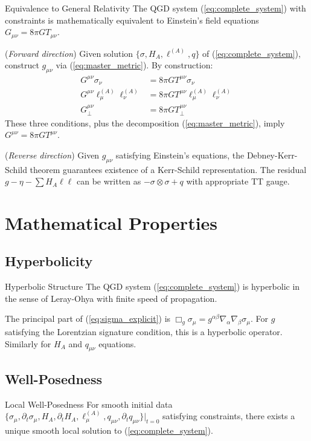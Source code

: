 \documentclass[11pt,a4paper]{article}
\theoremstyle{definition}
\theoremstyle{remark}
\begin{document}
			Equivalence to General Relativity
			The QGD system (\ref{eq:complete_system}) with constraints is mathematically equivalent to Einstein's field equations $G_{\mu\nu} = 8\pi G T_{\mu\nu}$.
		
			(\textit{Forward direction}) Given solution $\{\sigma, H_A, \ell^{(A)}, q\}$ of (\ref{eq:complete_system}), construct $g_{\mu\nu}$ via (\ref{eq:master_metric}). By construction:
			\begin{align}
				G^{\mu\nu}\sigma_\nu &= 8\pi G T^{\mu\nu}\sigma_\nu\\
				G^{\mu\nu}\ell_\mu^{(A)}\ell_\nu^{(A)} &= 8\pi G T^{\mu\nu}\ell_\mu^{(A)}\ell_\nu^{(A)}\\
				G_{\perp}^{\mu\nu} &= 8\pi G T_{\perp}^{\mu\nu}
			\end{align}
			These three conditions, plus the decomposition (\ref{eq:master_metric}), imply $G^{\mu\nu} = 8\pi G T^{\mu\nu}$.
			
			(\textit{Reverse direction}) Given $g_{\mu\nu}$ satisfying Einstein's equations, the Debney-Kerr-Schild theorem guarantees existence of a Kerr-Schild representation. The residual $g - \eta - \sum H_A\ell\ell$ can be written as $-\sigma\otimes\sigma + q$ with appropriate TT gauge.
		
		\section{Mathematical Properties}
		
		\subsection{Hyperbolicity}
		
			Hyperbolic Structure
			The QGD system (\ref{eq:complete_system}) is hyperbolic in the sense of Leray-Ohya with finite speed of propagation.
		
			The principal part of (\ref{eq:sigma_explicit}) is $\Box_g\sigma_\mu = g^{\alpha\beta}\nabla_\alpha\nabla_\beta\sigma_\mu$. For $g$ satisfying the Lorentzian signature condition, this is a hyperbolic operator. Similarly for $H_A$ and $q_{\mu\nu}$ equations.
		
		\subsection{Well-Posedness}
		
			Local Well-Posedness
			For smooth initial data $\{\sigma_\mu, \partial_t\sigma_\mu, H_A, \partial_t H_A, \ell_\mu^{(A)}, q_{\mu\nu}, \partial_t q_{\mu\nu}\}|_{t=0}$ satisfying constraints, there exists a unique smooth local solution to (\ref{eq:complete_system}).
		
\end{document}
